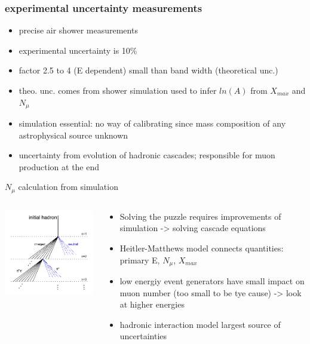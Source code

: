 \documentclass[aspectratio=1610, 9pt]{beamer}
\begin{document}
\begin{frame}\frametitle{experimental uncertainty measurements}
    \begin{itemize}
      \item precise air shower measurements
      \item experimental uncertainty is 10\%
      \item factor 2.5 to 4 (E dependent) small than band width (theoretical unc.)
      \item theo. unc. comes from shower simulation used to infer $ln(A)$ from $X_{max}$ and $N_{\mu}$
      \item simulation essential: no way of calibrating since mass composition of any astrophysical source unknown
      \item uncertainty from evolution of hadronic cascades; responsible for muon production at the end
      \end{itemize}
\end{frame}

\begin{frame}{$N_\mu$ calculation from simulation}
  \begin{columns}
    \begin{column}[c]{0.48\textwidth}
      \includegraphics{HM_model.png}
    \end{column}
    \begin{column}[c]{0.48\textwidth}
      \begin{itemize}
        \item Solving the puzzle requires improvements of simulation -> solving cascade equations
        \item Heitler-Matthews model connects quantities: primary E, $N_{\mu}$, $X_{max}$
        \item low energiy event generators have small impact on muon number (too small to be tye cause) -> look at higher energies
        \item hadronic interaction model largest source of uncertainties
      \end{itemize}
    \end{column}
  \end{columns}
\end{frame}
\end{document}
